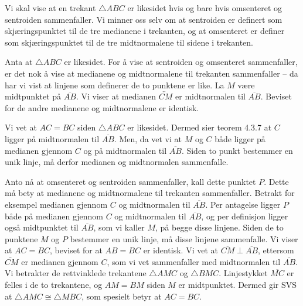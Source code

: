 \begin{oppgave}[5.6.11]
    Vi skal vise at en trekant $\triangle ABC$ er likesidet hvis og bare hvis omsenteret og sentroiden sammenfaller. 
    Vi minner oss selv om at sentroiden er definert som skjæringspunktet til de tre medianene i trekanten, og at omsenteret er definer som skjæringspunktet til de tre midtnormalene til sidene i trekanten. 

    Anta at $\triangle ABC$ er likesidet. 
    For å vise at sentroiden og omsenteret sammenfaller, er det nok å vise at medianene og midtnormalene til trekanten sammenfaller -- da har vi vist at linjene som definerer de to punktene er like. 
    La $M$ være midtpunktet på $\overline{AB}$. 
    Vi viser at medianen $\overleftrightarrow{CM}$ er midtnormalen til $\overline{AB}$. 
    Beviset for de andre medianene og midtnormalene er identisk. 

    Vi vet at $AC=BC$ siden $\triangle ABC$ er likesidet. 
    Dermed sier teorem 4.3.7 at $C$ ligger på midtnormalen til $\overline{AB}$. 
    Men, da vet vi at $M$ og $C$ både ligger på medianen gjennom $C$ og på midtnormalen til $\overline{AB}$. 
    Siden to punkt bestemmer en unik linje, må derfor medianen og midtnormalen sammenfalle. 

    Anto nå at omsenteret og sentroiden sammenfaller, kall dette punktet $P$. 
    Dette må bety at medianene og midtnormalene til trekanten sammenfaller. 
    Betrakt for eksempel medianen gjennom $C$ og midtnormalen til $\overline{AB}$. 
    Per antagelse ligger $P$ både på medianen gjennom $C$ og midtnormalen til $\overline{AB}$, og per definisjon ligger også midtpunktet til $\overline{AB}$, som vi kaller $M$, på begge disse linjene. 
    Siden de to punktene $M$ og $P$ bestemmer en unik linje, må disse linjene sammenfalle. 
    Vi viser at $AC=BC$, beviset for at $AB=BC$ er identisk. 
    Vi vet at $\overline{CM}\perp \overline{AB}$, ettersom $\overleftrightarrow{CM}$ er medianen gjennom $C$, som vi vet sammenfaller med midtnormalen til $\overline{AB}$. 
    Vi betrakter de rettvinklede trekantene $\triangle AMC$ og $\triangle BMC$. 
    Linjestykket $\overline{MC}$ er felles i de to trekantene, og $AM=BM$ siden $M$ er midtpunktet. 
    Dermed gir SVS at $\triangle AMC\cong \triangle MBC$, som spesielt betyr at $AC=BC$. 
\end{oppgave}

\begin{oppgave}[5.6.14]
    
\end{oppgave}

